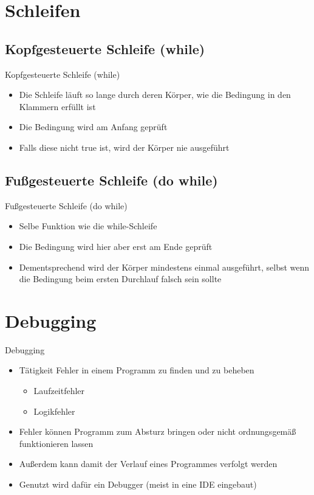 \section{Schleifen}
\subsection{Kopfgesteuerte Schleife (while)}
\begin{frame}{Kopfgesteuerte Schleife (while)}
	\begin{itemize}
		\item Die Schleife läuft so lange durch deren Körper, wie die Bedingung in den Klammern erfüllt ist
		\item Die Bedingung wird am Anfang geprüft
		\item Falls diese nicht \alert{true} ist, wird der Körper nie ausgeführt
	\end{itemize}
		
\end{frame}

\subsection{Fußgesteuerte Schleife (do while)}
\begin{frame}{Fußgesteuerte Schleife (do while)}
	\begin{itemize}
		\item Selbe Funktion wie die while-Schleife
		\item Die Bedingung wird hier aber erst am Ende geprüft
		\item Dementsprechend wird der Körper mindestens einmal ausgeführt, selbst wenn die Bedingung beim ersten Durchlauf falsch sein sollte
	\end{itemize}
		
\end{frame}

\section{Debugging}
\begin{frame}{Debugging}
	\begin{itemize}
		\item Tätigkeit Fehler in einem Programm zu finden und zu beheben
		\begin{itemize}
			\item Laufzeitfehler
			\item Logikfehler
		\end{itemize}
		\item Fehler können Programm zum Absturz bringen oder nicht ordnungsgemäß funktionieren lassen
		\item Außerdem kann damit der Verlauf eines Programmes verfolgt werden
	\end{itemize}
	\begin{itemize}
		\item Genutzt wird dafür ein Debugger (meist in eine IDE eingebaut)
	\end{itemize}
\end{frame}

